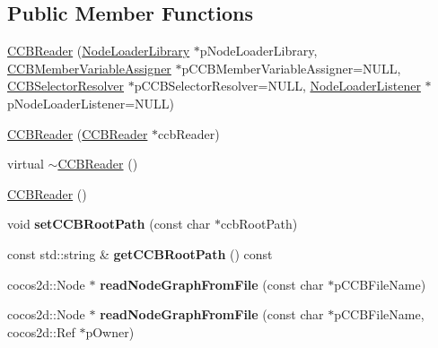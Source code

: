 \subsection*{Public Member Functions}
\begin{DoxyCompactItemize}
\item 
\hyperlink{classcocosbuilder_1_1CCBReader_adb695d57810485e6ae5f392f76c6f274}{C\+C\+B\+Reader} (\hyperlink{classcocosbuilder_1_1NodeLoaderLibrary}{Node\+Loader\+Library} $\ast$p\+Node\+Loader\+Library, \hyperlink{classcocosbuilder_1_1CCBMemberVariableAssigner}{C\+C\+B\+Member\+Variable\+Assigner} $\ast$p\+C\+C\+B\+Member\+Variable\+Assigner=N\+U\+LL, \hyperlink{classcocosbuilder_1_1CCBSelectorResolver}{C\+C\+B\+Selector\+Resolver} $\ast$p\+C\+C\+B\+Selector\+Resolver=N\+U\+LL, \hyperlink{classcocosbuilder_1_1NodeLoaderListener}{Node\+Loader\+Listener} $\ast$p\+Node\+Loader\+Listener=N\+U\+LL)
\item 
\hyperlink{classcocosbuilder_1_1CCBReader_af51acafdd83099e8e66fd8793036200d}{C\+C\+B\+Reader} (\hyperlink{classcocosbuilder_1_1CCBReader}{C\+C\+B\+Reader} $\ast$ccb\+Reader)
\item 
virtual \hyperlink{classcocosbuilder_1_1CCBReader_ac279554d8db61ff5efe66e51dafd326b}{$\sim$\+C\+C\+B\+Reader} ()
\item 
\hyperlink{classcocosbuilder_1_1CCBReader_ad400ef028022055a1e3a31aeb024c822}{C\+C\+B\+Reader} ()
\item 
\mbox{\label{classcocosbuilder_1_1CCBReader_a6d2c6fd1be3413b8b68b00bc2824259c}} 
void {\bfseries set\+C\+C\+B\+Root\+Path} (const char $\ast$ccb\+Root\+Path)
\item 
\mbox{\label{classcocosbuilder_1_1CCBReader_a71d6bae9f2124187098c0ab83fb3c816}} 
const std\+::string \& {\bfseries get\+C\+C\+B\+Root\+Path} () const
\item 
\mbox{\label{classcocosbuilder_1_1CCBReader_ad518485bcb3face43ac751d70ef6f78c}} 
cocos2d\+::\+Node $\ast$ {\bfseries read\+Node\+Graph\+From\+File} (const char $\ast$p\+C\+C\+B\+File\+Name)
\item 
\mbox{\label{classcocosbuilder_1_1CCBReader_a5ac598e80bc1fd03cc22db3600f10f29}} 
cocos2d\+::\+Node $\ast$ {\bfseries read\+Node\+Graph\+From\+File} (const char $\ast$p\+C\+C\+B\+File\+Name, cocos2d\+::\+Ref $\ast$p\+Owner)

\end{DoxyCompactItemize}
